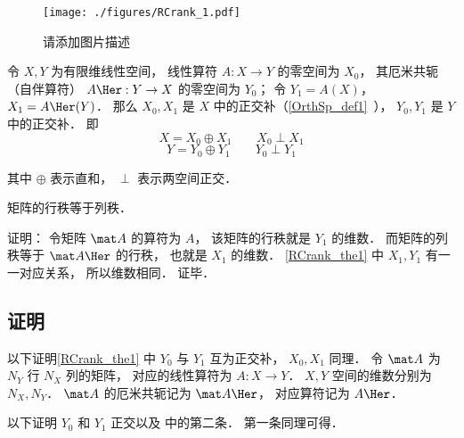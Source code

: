 
\begin{issues}
\issueDraft
\end{issues}


\begin{figure}[ht]
\centering
\texttt{[image: ./figures/RCrank\_1.pdf]}
\caption{请添加图片描述} \label{RCrank_fig1}
\end{figure}

\begin{theorem}{}\label{RCrank_the1}
令 $X, Y$ 为有限维线性空间， 线性算符 $A:X \to Y$ 的零空间为 $X_0$， 其厄米共轭（自伴算符） $A\Her: Y \to X$ 的零空间为 $Y_0$； 令 $Y_1 = A(X)$， $X_1 = A\Her(Y)$． 那么 $X_0, X_1$ 是 $X$ 中的正交补（\autoref{OrthSp_def1}~）， $Y_0, Y_1$ 是 $Y$ 中的正交补． 即
\begin{equation}
X = X_0 \oplus X_1 \qquad X_0 \perp X_1
\end{equation}
\begin{equation}
Y = Y_0 \oplus Y_1 \qquad Y_0 \perp Y_1
\end{equation}
\end{theorem}
其中 $\oplus$ 表示直和， $\perp$ 表示两空间正交．

\begin{corollary}{}
矩阵的行秩等于列秩．
\end{corollary}
证明： 令矩阵 $\mat A$ 的算符为 $A$， 该矩阵的行秩就是 $Y_1$ 的维数． 而矩阵的列秩等于 $\mat A\Her$ 的行秩， 也就是 $X_1$ 的维数． \autoref{RCrank_the1} 中 $X_1, Y_1$ 有一一对应关系， 所以维数相同． 证毕．

\subsection{证明}
以下证明\autoref{RCrank_the1} 中 $Y_0$ 与 $Y_1$ 互为正交补， $X_0, X_1$ 同理． 令 $\mat A$ 为 $N_Y$ 行 $N_X$ 列的矩阵， 对应的线性算符为 $A: X\to Y$． $X, Y$ 空间的维数分别为 $N_X, N_Y$． $\mat A$ 的厄米共轭记为 $\mat A\Her$， 对应算符记为 $A\Her$．



以下证明 $Y_0$ 和 $Y_1$ 正交以及 中的第二条． 第一条同理可得．

